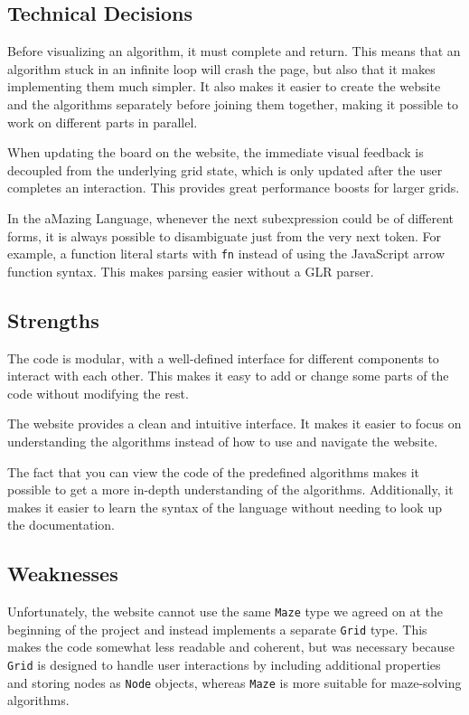 \subsection{Technical Decisions}

Before visualizing an algorithm, it must complete and return. This means that an algorithm stuck in an infinite loop will crash the page, but also that it makes implementing them much simpler. It also makes it easier to create the website and the algorithms separately before joining them together, making it possible to work on different parts in parallel.

When updating the board on the website, the immediate visual feedback is decoupled from the underlying grid state, which is only updated after the user completes an interaction. This provides great performance boosts for larger grids.

In the aMazing Language, whenever the next subexpression could be of different forms, it is always possible to disambiguate just from the very next token. For example, a function literal starts with \verb|fn| instead of using the JavaScript arrow function syntax. This makes parsing easier without a GLR parser.

\subsection{Strengths}

The code is modular, with a well-defined interface for different components to interact with each other. This makes it easy to add or change some parts of the code without modifying the rest.

The website provides a clean and intuitive interface. It makes it easier to focus on understanding the algorithms instead of how to use and navigate the website.

The fact that you can view the code of the predefined algorithms makes it possible to get a more in-depth understanding of the algorithms. Additionally, it makes it easier to learn the syntax of the language without needing to look up the documentation.

\subsection{Weaknesses}

Unfortunately, the website cannot use the same \texttt{Maze} type we agreed on at the beginning of the project and instead implements a separate \texttt{Grid} type. This makes the code somewhat less readable and coherent, but was necessary because \texttt{Grid} is designed to handle user interactions by including additional properties and storing nodes as \texttt{Node} objects, whereas \texttt{Maze} is more suitable for maze-solving algorithms.

